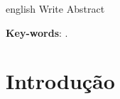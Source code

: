 \documentclass[
	12pt,			%
	openright,		%
	oneside,			%
	a4paper,			%
	chapter=TITLE,		%
	english,			%
	brazil,			%
	]{abntex2}
\begin{document}
\begin{resumo}[Abstract]
 \begin{otherlanguage*}{english}
Write Abstract

   \vspace{\onelineskip}
 
   \noindent 
   \textbf{Key-words}: .
 \end{otherlanguage*}
\end{resumo}

\listoffigures*
\cleardoublepage

\listoftables*
\cleardoublepage



\tableofcontents*
\cleardoublepage



\textual

\chapter[Introdução]{Introdução}
\end{document}
